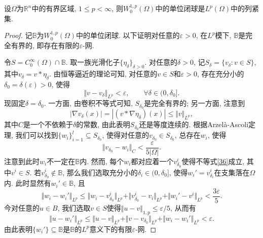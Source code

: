 \begin{proposition}[Rellich]
    设$\Omega$为$\mathbb{R}^n$中的有界区域, $1 \leq p < \infty$, 则$W_0^{1, p}(\Omega)$中的单位闭球是$L^p(\Omega)$中的列紧集.
    \begin{proof}
        记$\mathbb{B}$为$W_0^{1, p}(\Omega)$中的单位闭球. 以下证明对任意的$\varepsilon > 0$, 在$L^p$模下, $\mathbb{B}$是完全有界的, 即存在有限的$\varepsilon$-网. 

        令$S = C_0^{\infty}(\Omega) \cap \mathbb{B}$. 取一族光滑化子$\{\eta_{\delta}\}_{\delta > 0}$.
        对任意的$\delta > 0$, 记$S_{\delta} = \{v_{\delta}\colon v \in S\}$, 其中$v_{\delta} = v \ast \eta_{\delta}$.
        由恒等逼近的理论可知, 对任意的$v \in S$和$\varepsilon > 0$, 存在充分小的$\delta_0 = \delta(\varepsilon) > 0$, 使得 
        \begin{equation*}
            \Vert v - v_{\delta} \Vert_{L^p} < \varepsilon, \qquad \forall \delta \in (0, \delta_0].
        \end{equation*}
        现固定$\delta = \delta_0$. 一方面, 由卷积不等式可知, $S_{\delta_0}$是完全有界的; 另一方面, 注意到 
        \begin{equation*}
            |\nabla v_{\delta}(x)| = |(v \ast \nabla\eta_{\delta})(x)| \leq \Vert v \Vert_{L^p},
        \end{equation*}
        其中$C$是一个不依赖于$\delta$的常数, 由此表明$S_{\delta_0}$还是等度连续的. 
        根据Arzelà-Ascoli定理, 我们可以找到$\{w_i\}_{i = 1}^l \subseteq S_{\delta_0}$, 使得对任意的$v_{\delta_0} \in S_{\delta_0}$, 总存在$w_i$, 使得 
        \begin{equation}\label{36}
            \Vert v_{\delta_0} - w_i\Vert_C < \frac{\varepsilon}{5|\Omega|}.
        \end{equation} 
        注意到此时$w_i$不一定在$\mathbb{B}$内. 然而, 每个$w_i$都对应着一个$v_{\delta_0}^i$使得不等式\eqref{36}成立, 其中$v^i \in S$.
        若$v_{\delta_0}^i \notin \mathbb{B}$, 那么我们选取充分小的$\delta_i \in (0, \delta_0]$, 使得$w_i' = v_{\delta_i}^i$在支集落在$\Omega$内.
        此时显然有$w_i' \in \mathbb{B}$, 且 
        \begin{equation*}
            \Vert w_i - w_i'\Vert_{L^p} \leq \Vert w_i - v^i_{\delta_0}\Vert_{L^p} + \Vert v^i_{\delta_0} - v_i\Vert_{L^p} +  \Vert w_i' - v^i\Vert_{L^p} < \frac{3\varepsilon}{5}.
        \end{equation*}
        今对任意的$u \in B$, 我们选取$v \in S$使得$\Vert u - v \Vert_{1, p} \leq \varepsilon/5$, 从而有 
        \begin{equation*}
            \Vert u - w_i'\Vert_{L^p} \leq \Vert u - v \Vert_{L^p} + \Vert v - v_{\delta_0} \Vert_{L^p} + \Vert w_i - w_i'\Vert_{L^p} < \varepsilon.
        \end{equation*}
        由此表明$\{w_i'\} \subseteq \mathbb{B}$是$\mathbb{B}$的$L^p$意义下的有限$\varepsilon$-网.
    \end{proof}
\end{proposition}

